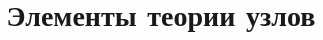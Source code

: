 \documentclass[a4paper]{scrartcl}
\begin{document}
\title{Элементы теории узлов}

\stealcurrent
\end{document}
